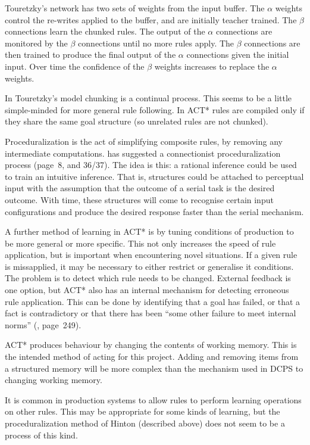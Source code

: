 Touretzky's network has two sets of weights from the input buffer. The
$\alpha$ weights control the re-writes applied to the buffer, and are
initially teacher trained. The $\beta$ connections learn the chunked
rules.  The output of the $\alpha$ connections are monitored by the
$\beta$ connections until no more rules apply.  The $\beta$
connections are then trained to produce the final output of the
$\alpha$ connections given the initial input.  Over time the
confidence of the $\beta$ weights increases to replace the $\alpha$
weights.

In Touretzky's model chunking is a continual process.  This seems
to be a little simple-minded for more general rule following.  In
ACT* rules are compiled only if they share the same goal
structure (so unrelated rules are not chunked).

Proceduralization is the act of simplifying composite rules, 
by removing any intermediate computations.  has
suggested a connectionist proceduralization process 
(page~8, and 36/37). The idea is this: a rational
inference could be used to train an intuitive
inference.  That is, structures could be attached to perceptual input
with the assumption that the outcome of a serial task is the desired
outcome.  With time, these structures will come to recognise certain
input configurations and produce the desired response faster than the
serial mechanism.

  A further method of learning in ACT* is by 
tuning conditions of production to be more general or more 
specific.  This not only increases the speed of rule application, 
but is important when encountering novel situations.  If a given 
rule is missapplied, it may be necessary to 
either restrict or generalise it conditions.  The problem is to 
detect which rule needs to be changed.  External feedback is one 
option, but ACT* also has an internal mechanism for detecting 
erroneous rule application.  This can be done by identifying that a 
goal has failed, or that a fact is contradictory or that there has 
been ``some other failure to meet internal norms''
(, page~249).


ACT* produces behaviour by changing the contents of working
memory.  This is the intended method of acting for this project.
Adding and removing items from a structured memory will be more
complex than the mechanism used in DCPS to changing working
memory.

It is common in production systems to allow rules
to perform learning operations on other rules.  This may be
appropriate for some kinds of learning, but the proceduralization
method of Hinton (described above) does not seem to be a process
of this kind.

